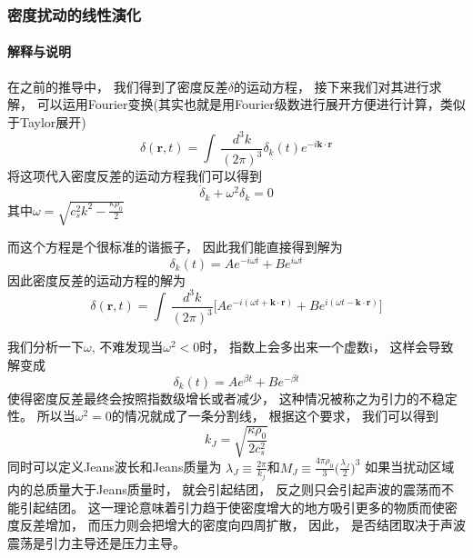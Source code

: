 \documentclass[8pt]{beamer}
\begin{document}
        \begin{frame}[fragile]
            \frametitle{密度扰动的线性演化}
            \framesubtitle{解释与说明}
            \begin{multicols}{2} 
                \qquad
                在之前的推导中，
                我们得到了密度反差$\delta$的运动方程，
                接下来我们对其进行求解，
                可以运用Fourier变换(其实也就是用Fourier级数进行展开方便进行计算，类似于Taylor展开)
                $$\delta(\textbf{r},t)=\int\,\frac{d^3k}{(2\pi)^3}\delta_k(t)e^{-i\textbf{k}\cdot\textbf{r}}$$
                将这项代入密度反差的运动方程我们可以得到
                $$\ddot{\delta}_k+\omega^2\delta_k=0$$
                其中$\omega=\sqrt{c^2 _sk^2-\frac{\kappa\rho_0}{2}}$

                \qquad
                而这个方程是个很标准的谐振子，
                因此我们能直接得到解为
                $$\delta_k(t)=Ae^{-i\omega t}+Be^{i\omega t}$$
                因此密度反差的运动方程的解为
                $$\delta(\textbf{r},t)=\int \,\frac{d^3k}{(2\pi)^3}\bigg[Ae^{-i(\omega t+\textbf{k}\cdot\textbf{r})}+Be^{i(\omega t-\textbf{k}\cdot\textbf{r})}\bigg]$$

                \qquad
                我们分析一下$\omega$,
                不难发现当$\omega^2<0$时，
                指数上会多出来一个虚数i，
                这样会导致解变成
                $$\delta_k(t)=Ae^{\beta t}+Be^{-\beta t}$$
                使得密度反差最终会按照指数级增长或者减少，
                这种情况被称之为引力的不稳定性。
                所以当$\omega^2=0$的情况就成了一条分割线，
                根据这个要求，
                我们可以得到
                $$k_J=\sqrt{\frac{\kappa\rho_0}{2c_s^2}}$$
                同时可以定义Jeans波长和Jeans质量为
                $\lambda_J\equiv\frac{2\pi}{k_j}$和$M_J\equiv\frac{4\pi\rho_0}{3}\biggl(\frac{\lambda_J}{2}\biggr)^3$
                如果当扰动区域内的总质量大于Jeans质量时，
                就会引起结团，
                反之则只会引起声波的震荡而不能引起结团。
                这一理论意味着引力趋于使密度增大的地方吸引更多的物质而使密度反差增加，
                而压力则会把增大的密度向四周扩散，
                因此，
                是否结团取决于声波震荡是引力主导还是压力主导。
            \end{multicols}
        \end{frame}
\end{document}

